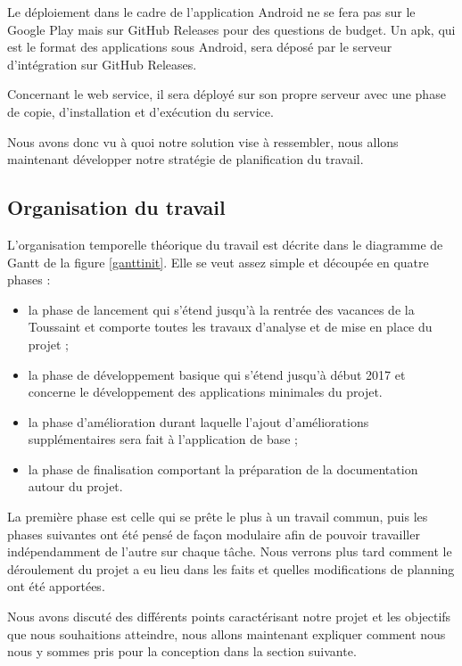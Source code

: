 Le déploiement dans le cadre de l’application Android ne se fera pas sur le Google Play mais sur GitHub Releases pour des questions de budget. Un apk, qui est le format des applications sous Android, sera déposé par le serveur d’intégration sur GitHub Releases.

Concernant le web service, il sera déployé sur son propre serveur avec une phase de copie, d’installation et d’exécution du service.

Nous avons donc vu à quoi notre solution vise à ressembler, nous allons maintenant développer notre stratégie de planification du travail.

\subsection{Organisation du travail}

L'organisation temporelle théorique du travail est décrite dans le diagramme de Gantt de la figure \ref{ganttinit}. Elle se veut assez simple et découpée en quatre phases :

\begin{itemize}
    \item la phase de lancement qui s’étend jusqu’à la rentrée des vacances de la Toussaint et comporte toutes les travaux d’analyse et de mise en place du projet ;
    \item la phase de développement basique qui s’étend jusqu’à début 2017 et concerne le développement des applications minimales du projet.
    \item la phase d’amélioration durant laquelle l’ajout d’améliorations supplémentaires sera fait à l’application de base ;
    \item la phase de finalisation comportant la préparation de la documentation autour du projet.
\end{itemize}

La première phase est celle qui se prête le plus à un travail commun, puis les phases suivantes ont été pensé de façon modulaire afin de pouvoir travailler indépendamment de l’autre sur chaque tâche. Nous verrons plus tard comment le déroulement du projet a eu lieu dans les faits et quelles modifications de planning ont été apportées.

Nous avons discuté des différents points caractérisant notre projet et les objectifs que nous souhaitions atteindre, nous allons maintenant expliquer comment nous nous y sommes pris pour la conception dans la section suivante.

